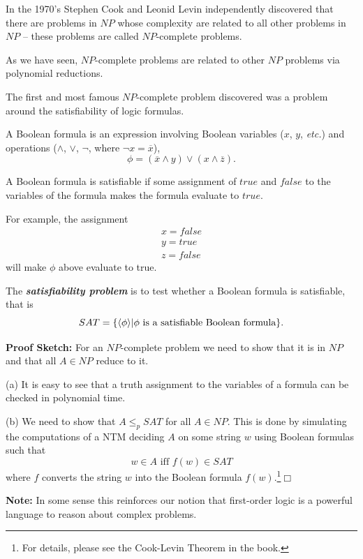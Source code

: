 \documentclass[a4paper,blends,pdf,colorBG,slideColor]{prosper}
\begin{document}
In the 1970's Stephen Cook and Leonid Levin independently discovered that there
are problems in $NP$ whose complexity are related to all other problems in $NP$ -- these problems are called $NP$-complete problems.

As we have seen, $NP$-complete problems are related to other $NP$ problems 
via polynomial reductions.

The first and most famous $NP$-complete problem discovered was a problem 
around the satisfiability of logic formulas.


\es

{\small
A Boolean formula is an expression involving Boolean variables ($x$, $y$, {\em etc.}) and operations ($\wedge$, $\vee$, $\neg$, where $\neg x = \overline{x}$), 
\[
\phi = (\overline{x} \wedge y) \vee (x \wedge \overline{z}).
\]

A Boolean formula is satisfiable if some assignment of $true$ and $false$ to the variables of the formula makes the formula evaluate to $true$.

For example, the assignment
\[
\begin{array}{l}
x = false\\
y = true\\
z = false
\end{array}
\]
will make $\phi$ above evaluate to true.

The {\bf\em satisfiability problem} is to test whether a Boolean formula is satisfiable,
that is
\[
SAT = \{ \langle {\phi} \rangle| \mbox{$\phi$ is a satisfiable Boolean formula}\}.
\]
}
\es

{\small
{}
{\bf Proof Sketch:}  For an $NP$-complete problem we need to show that it is in 
$NP$ and that all $A \in NP$ reduce to it.

(a)  It is easy to see that a truth assignment to the variables of a formula can be
checked in polynomial time.

(b) We need to show that $A \le_p SAT$ for all $A \in NP$.  This is done by
simulating the computations of a NTM deciding $A$ on some string $w$ using
Boolean formulas such that
\[
w \in A \mbox{ iff } f(w) \in SAT
\]
where $f$ converts the string $w$ into the Boolean formula $f(w)$.\footnote{For details, please see the Cook-Levin Theorem in the book.}$\Box$

{\bf Note:} In some sense this reinforces our notion that first-order logic is a powerful
language to reason about complex problems.
}
\es
\end{document}
